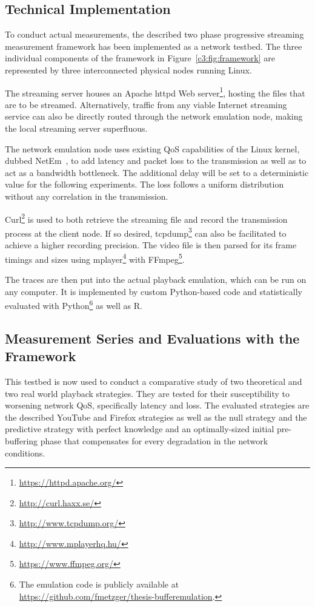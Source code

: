 \subsection{Technical Implementation}

To conduct actual measurements, the described two phase progressive streaming measurement framework has been implemented as a network testbed. The three individual components of the framework in Figure~\ref{c3:fig:framework} are represented by three interconnected physical nodes running Linux. 

The streaming server houses an Apache httpd Web server\footnote{\url{https://httpd.apache.org/}}, hosting the files that are to be streamed. Alternatively, traffic from any viable Internet streaming service can also be directly routed through the network emulation node, making the local streaming server superfluous.

The network emulation node uses existing \gls{QoS} capabilities of the Linux kernel, dubbed NetEm~\cite{hemminger2005network}, to add latency and packet loss to the transmission as well as to act as a bandwidth bottleneck. The additional delay will be set to a deterministic value for the following experiments. The loss follows a uniform distribution without any correlation in the transmission.

Curl\footnote{\url{http://curl.haxx.se/}} is used to both retrieve the streaming file and record the transmission process at the client node. If so desired, tcpdump\footnote{\url{http://www.tcpdump.org/}} can also be facilitated to achieve a higher recording precision. The video file is then parsed for its frame timings and sizes using mplayer\footnote{\url{http://www.mplayerhq.hu/}} with FFmpeg\footnote{\url{https://www.ffmpeg.org/}}. 

The traces are then put into the actual playback emulation, which can be run on any computer. It is implemented by custom Python-based code and statistically evaluated with Python\footnote{The emulation code is publicly available at \url{https://github.com/fmetzger/thesis-bufferemulation}.} as well as R.


\subsection{Measurement Series and Evaluations with the Framework}

This testbed is now used to conduct a comparative study of two theoretical and two real world playback strategies. They are tested for their susceptibility to worsening network \gls{QoS}, specifically latency and loss. The evaluated strategies are the described YouTube and Firefox strategies as well as the null strategy and the predictive strategy with perfect knowledge and an optimally-sized initial pre-buffering phase that compensates for every degradation in the network conditions.

